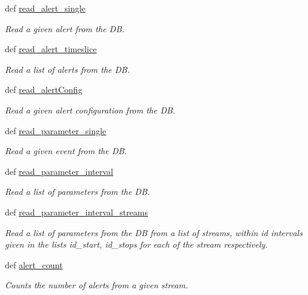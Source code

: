 \begin{DoxyCompactItemize}
def \hyperlink{namespaceamonpy_1_1dbase_1_1db__read_a827488ee2cbca3079ec2875508c9c9f5}{read\-\_\-alert\-\_\-single}
\begin{DoxyCompactList}\small\item\em Read a given alert from the D\-B. \end{DoxyCompactList}\item 
def \hyperlink{namespaceamonpy_1_1dbase_1_1db__read_a5b9cc348ea38bff43d6d2798e33a6c50}{read\-\_\-alert\-\_\-timeslice}
\begin{DoxyCompactList}\small\item\em Read a list of alerts from the D\-B. \end{DoxyCompactList}\item 
def \hyperlink{namespaceamonpy_1_1dbase_1_1db__read_ac6c02b3b64cf22309d7ab92ec7aa64e8}{read\-\_\-alert\-Config}
\begin{DoxyCompactList}\small\item\em Read a given alert configuration from the D\-B. \end{DoxyCompactList}\item 
def \hyperlink{namespaceamonpy_1_1dbase_1_1db__read_af44cf8f28c8cb5c845fab0667f035770}{read\-\_\-parameter\-\_\-single}
\begin{DoxyCompactList}\small\item\em Read a given event from the D\-B. \end{DoxyCompactList}\item 
def \hyperlink{namespaceamonpy_1_1dbase_1_1db__read_aeb91007cbf02a072b256bc02dd59b1fd}{read\-\_\-parameter\-\_\-interval}
\begin{DoxyCompactList}\small\item\em Read a list of parameters from the D\-B. \end{DoxyCompactList}\item 
def \hyperlink{namespaceamonpy_1_1dbase_1_1db__read_a9ea1ff5e9c081631e6df34550a8005f0}{read\-\_\-parameter\-\_\-interval\-\_\-streams}
\begin{DoxyCompactList}\small\item\em Read a list of parameters from the D\-B from a list of streams, within id intervals given in the lists id\-\_\-start, id\-\_\-stops for each of the stream respectively. \end{DoxyCompactList}\item 
def \hyperlink{namespaceamonpy_1_1dbase_1_1db__read_a043531a3ecc1db0de4824643e6a48e51}{alert\-\_\-count}
\begin{DoxyCompactList}\small\item\em Counts the number of alerts from a given stream. \end{DoxyCompactList}\item 

\end{DoxyCompactItemize}
